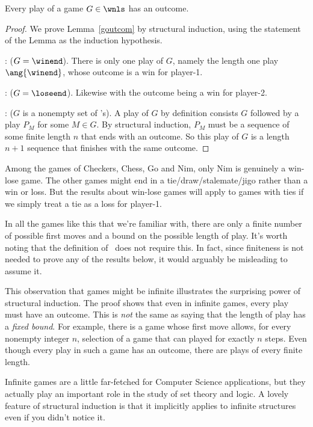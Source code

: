 \begin{definition}
\begin{lemma}\label{goutcom}
Every play of a game $G \in \wnls$ has an outcome.
\end{lemma}

\begin{proof}
We prove Lemma~\ref{goutcom} by structural induction, using the
statement of the Lemma as the induction hypothesis.

: ($G = \winend$).  There is only one play of
$G$, namely the length one play $\ang{\winend}$, whose outcome is a
win for player-1.

: ($G= \loseend$).  Likewise with the outcome
being a win for player-2.

: ($G$ is a nonempty set of \wnls's).
A play of $G$ by definition consists $G$ followed by a play $P_M$ for
some $M \in G$.  By structural induction, $P_M$ must be a sequence of
some finite length $n$ that ends with an outcome.  So this play of $G$
is a length $n+1$ sequence that finishes with the same outcome.
\end{proof}

Among the games of Checkers, Chess, Go and Nim, only Nim is genuinely
a win-lose game.  The other games might end in a
tie/draw/stalemate/jigo rather than a win or loss.  But the results
about win-lose games will apply to games with ties if we simply treat
a tie as a loss for player-1.

In all the games like this that we're familiar with, there are only a
finite number of possible first moves and a bound on the possible
length of play.  It's worth noting that the definition of \wnls\ does
not require this.  In fact, since finiteness is not needed to prove
any of the results below, it would arguably be misleading to assume
it.

This observation that games might be infinite illustrates the
surprising power of structural induction.  The proof shows that even
in infinite games, every play must have an outcome.  This is
\emph{not} the same as saying that the length of play has a
\emph{fixed bound}.  For example, there is a game whose first move
allows, for every nonempty integer $n$, selection of a game that can
played for exactly $n$ steps.  Even though every play in such a game
has an outcome, there are plays of every finite length.

Infinite games are a little far-fetched for Computer Science
applications, but they actually play an important role in the study of
set theory and logic.  A lovely feature of structural induction is
that it implicitly applies to infinite structures even if you didn't
notice it.


\end{definition}
